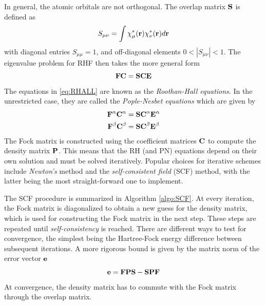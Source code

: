 In general, the atomic orbitals are not orthogonal. The overlap matrix $\mathbf{S}$ is defined as 
\begin{equation}
S_{\mu\nu} = \int \chi_{\mu}^*(\mathbf{r}) \chi_{\nu}^*(\mathbf{r}) d\mathbf{r}
\end{equation}
\noindent with diagonal entries $S_{\mu\mu} = 1$, and off-diagonal elements $0 < \left\lvert S_{\mu\nu} \right\rvert < 1$. The eigenvalue problem for RHF then takes the more general form
\begin{equation}
\mathbf{F} \mathbf{C} = \mathbf{SC} \mathbf{E}
\label{eq:RHALL}
\end{equation}
\noindent The equations in \ref{eq:RHALL} are known as the \emph{Roothan-Hall equations}. In the unrestricted case, they are called the \emph{Pople-Nesbet equations} which are given by
\begin{align}
\mathbf{F}^{\alpha} \mathbf{C}^{\alpha} &= \mathbf{SC}^{\alpha} \mathbf{E}^{\alpha} \\
\mathbf{F}^{\beta} \mathbf{C}^{\beta} &= \mathbf{SC}^{\beta} \mathbf{E}^{\beta}
\end{align}  
\noindent The Fock matrix is constructed using the coefficient matrices $\mathbf{C}$ to compute the density matrix $\mathbf{P}$. This means that the RH (and PN) equations depend on their own solution and must be solved iteratively. Popular choices for iterative schemes include \emph{Newton's} method and the \emph{self-consistent field} (SCF) method, with the latter being the most straight-forward one to implement. 

The SCF procedure is summarized in Algorithm \ref{algo:SCF}. At every iteration, the Fock matrix is diagonalized to obtain a new guess for the density matrix, which is used for constructing the Fock matrix in the next step. These steps are repeated until \emph{self-consistency} is reached. There are different ways to test for convergence, the simplest being the Hartree-Fock energy difference between subsequent iterations. A more rigorous bound is given by the matrix norm of the error vector $\mathbf{e}$
\begin{equation}
\mathbf{e} = \mathbf{FPS} - \mathbf{SPF} 
\end{equation}
\noindent At convergence, the density matrix has to commute with the Fock matrix through the overlap matrix. 

